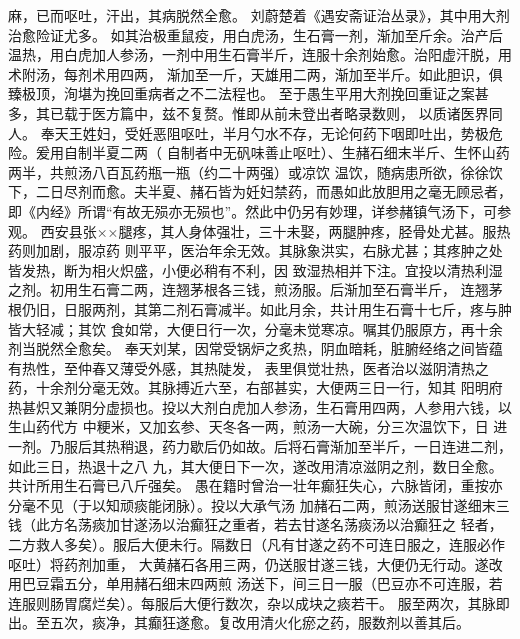 \documentclass[a4paper,12pt,UTF8,twoside]{ctexbook}
\begin{document}
麻，已而呕吐，汗出，其病脱然全愈。 
刘蔚楚着《遇安斋证治丛录》，其中用大剂治愈险证尤多。 
如其治极重鼠疫，用白虎汤，生石膏一剂，渐加至斤余。治产后 
温热，用白虎加人参汤，一剂中用生石膏半斤，连服十余剂始愈。治阳虚汗脱，用术附汤，每剂术用四两， 
渐加至一斤，天雄用二两，渐加至半斤。如此胆识，俱臻极顶，洵堪为挽回重病者之不二法程也。 
至于愚生平用大剂挽回重证之案甚多，其已载于医方篇中，兹不复赘。惟即从前未登出者略录数则， 
以质诸医界同人。 
奉天王姓妇，受妊恶阻呕吐，半月勺水不存，无论何药下咽即吐出，势极危险。爰用自制半夏二两（ 
自制者中无矾味善止呕吐）、生赭石细末半斤、生怀山药两半，共煎汤八百瓦药瓶一瓶（约二十两强）或凉饮 
温饮，随病患所欲，徐徐饮下，二日尽剂而愈。夫半夏、赭石皆为妊妇禁药，而愚如此放胆用之毫无顾忌者， 
即《内经》所谓“有故无殒亦无殒也”。然此中仍另有妙理，详参赭镇气汤下，可参观。 
西安县张××腿疼，其人身体强壮，三十未娶，两腿肿疼，胫骨处尤甚。服热药则加剧，服凉药 
则平平，医治年余无效。其脉象洪实，右脉尤甚；其疼肿之处皆发热，断为相火炽盛，小便必稍有不利，因 
致湿热相并下注。宜投以清热利湿之剂。初用生石膏二两，连翘茅根各三钱，煎汤服。后渐加至石膏半斤， 
连翘茅根仍旧，日服两剂，其第二剂石膏减半。如此月余，共计用生石膏十七斤，疼与肿皆大轻减；其饮 
食如常，大便日行一次，分毫未觉寒凉。嘱其仍服原方，再十余剂当脱然全愈矣。 
奉天刘某，因常受锅炉之炙热，阴血暗耗，脏腑经络之间皆蕴有热性，至仲春又薄受外感，其热陡发， 
表里俱觉壮热，医者治以滋阴清热之药，十余剂分毫无效。其脉搏近六至，右部甚实，大便两三日一行，知其 
阳明府热甚炽又兼阴分虚损也。投以大剂白虎加人参汤，生石膏用四两，人参用六钱，以生山药代方 
中粳米，又加玄参、天冬各一两，煎汤一大碗，分三次温饮下，日 
进一剂。乃服后其热稍退，药力歇后仍如故。后将石膏渐加至半斤，一日连进二剂，如此三日，热退十之八 
九，其大便日下一次，遂改用清凉滋阴之剂，数日全愈。共计所用生石膏已八斤强矣。 
愚在籍时曾治一壮年癫狂失心，六脉皆闭，重按亦分毫不见（于以知顽痰能闭脉）。投以大承气汤 
加赭石二两，煎汤送服甘遂细末三钱（此方名荡痰加甘遂汤以治癫狂之重者，若去甘遂名荡痰汤以治癫狂之 
轻者，二方救人多矣）。服后大便未行。隔数日（凡有甘遂之药不可连日服之，连服必作呕吐）将药剂加重， 
大黄赭石各用三两，仍送服甘遂三钱，大便仍无行动。遂改用巴豆霜五分，单用赭石细末四两煎 
汤送下，间三日一服（巴豆亦不可连服，若连服则肠胃腐烂矣）。每服后大便行数次，杂以成块之痰若干。 
服至两次，其脉即出。至五次，痰净，其癫狂遂愈。复改用清火化瘀之药，服数剂以善其后。 
\end{document}
